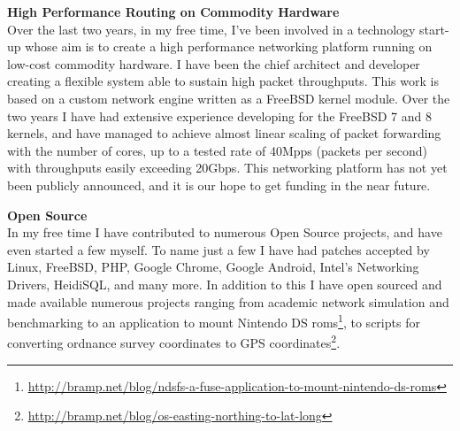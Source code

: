 \documentclass[a4paper,10pt]{article}
\begin{document}
\textbf{High Performance Routing on Commodity Hardware}\\
 Over the last two years, in my free time, I've been involved in a technology start-up whose aim is to create a high performance networking platform running on low-cost commodity hardware. I have been the chief architect and developer creating a flexible system able to sustain high packet throughputs. This work is based on a custom network engine written as a FreeBSD kernel module. Over the two years I have had extensive experience developing for the FreeBSD 7 and 8 kernels, and have managed to achieve almost linear scaling of packet forwarding with the number of cores, up to a tested rate of 40Mpps (packets per second) with throughputs easily exceeding 20Gbps. This networking platform has not yet been publicly announced, and it is our hope to get funding in the near future.
\vspace{1em}

\textbf{Open Source}\\
 In my free time I have contributed to numerous Open Source projects, and have even started a few myself. To name just a few I have had patches accepted by Linux, FreeBSD, PHP, Google Chrome, Google Android, Intel's Networking Drivers, HeidiSQL, and many more. In addition to this I have open sourced and made available numerous projects ranging from academic network simulation and benchmarking to an application to mount Nintendo DS roms\footnote{\href{http://bramp.net/blog/ndsfs-a-fuse-application-to-mount-nintendo-ds-roms}{http://bramp.net/blog/ndsfs-a-fuse-application-to-mount-nintendo-ds-roms}}, to scripts for converting ordnance survey coordinates to GPS coordinates\footnote{\href{http://bramp.net/blog/os-easting-northing-to-lat-long}{http://bramp.net/blog/os-easting-northing-to-lat-long}}.
\end{document}
